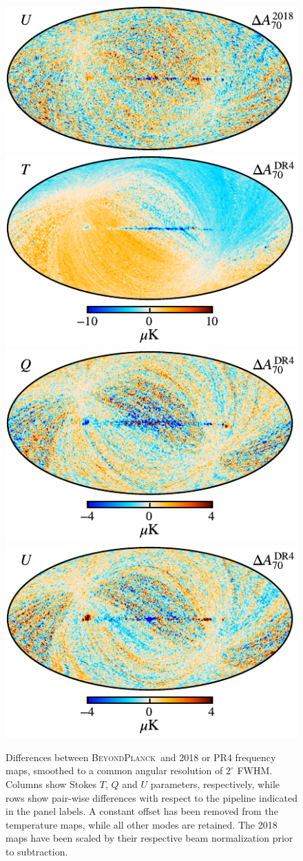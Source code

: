 \documentclass[twocolumn]{aa}
\newcommand{\BP}{\textsc{BeyondPlanck}}
\begin{document}
\begin{figure}[p]
  \includegraphics[width=0.33\linewidth]{figs/BP_070_diff_dx12_v2_U_DIFF_w8_n1024_c-planck.pdf}\\
  \includegraphics[width=0.33\linewidth]{figs/BP_070_diff_npipe_v2_I_DIFF_w8_n1024_cb_c-planck.pdf}
  \includegraphics[width=0.33\linewidth]{figs/BP_070_diff_npipe_v2_Q_DIFF_w8_n1024_cb_c-planck.pdf}
  \includegraphics[width=0.33\linewidth]{figs/BP_070_diff_npipe_v2_U_DIFF_w8_n1024_cb_c-planck.pdf}\\
  \caption{Differences between \BP\ and 2018 or PR4 frequency
    maps, smoothed to a common angular resolution of $2^{\circ}$
    FWHM. Columns show Stokes $T$, $Q$ and $U$ parameters,
    respectively, while rows show pair-wise differences with respect
    to the pipeline indicated in the panel labels. A constant offset
    has been removed from the temperature maps, while all other modes
    are retained. The 2018 maps have been scaled by their respective
    beam normalization prior to subtraction.
  }\label{fig:freqdiff}
\end{figure}
\end{document}

